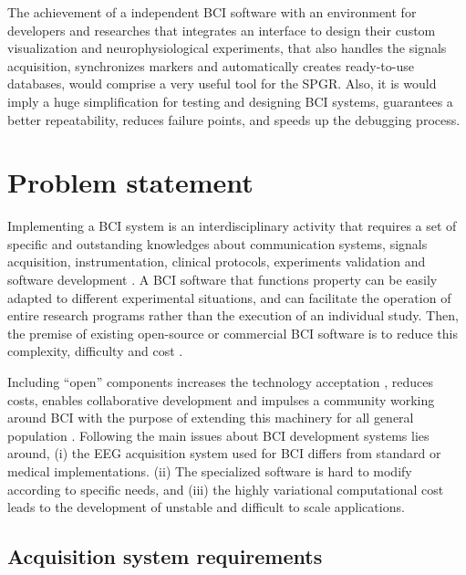 The achievement of a independent \gls*{BCI} software with an environment for developers and researches that integrates an interface to design their custom visualization and neurophysiological experiments, that also handles the signals acquisition, synchronizes markers and automatically creates ready-to-use databases, would comprise a very useful tool for the SPGR. Also, it is would imply a huge simplification for testing and designing \gls*{BCI} systems, guarantees a better repeatability, reduces failure points, and speeds up the debugging process.

\section{Problem statement}\label{sec:problem} 

Implementing a \gls*{BCI} system is an interdisciplinary activity that requires a set of specific and outstanding knowledges about communication systems, signals acquisition, instrumentation, clinical protocols, experiments validation and software development \cite{wolpaw2002brain}. A \gls*{BCI} software that functions property can be easily adapted to different experimental situations, and can facilitate the operation of entire research programs rather than the execution of an individual study. Then, the premise of existing open-source or commercial \gls*{BCI} software is to reduce this complexity, difficulty and cost \cite{nam2018brain}.

Including “open” components increases the technology acceptation \cite{wessel2019switching}, reduces costs, enables collaborative development and impulses a community working around \gls*{BCI} with the purpose of extending this machinery for all general population \cite{wolpaw2012brain}. Following the main issues about \gls*{BCI} development systems lies around, (i) the EEG acquisition system used for \gls*{BCI} differs from standard or medical implementations. (ii) The specialized software is hard to modify according to specific needs, and (iii) the highly variational computational cost leads to the development of unstable and difficult to scale applications.

\subsection{Acquisition system requirements}

